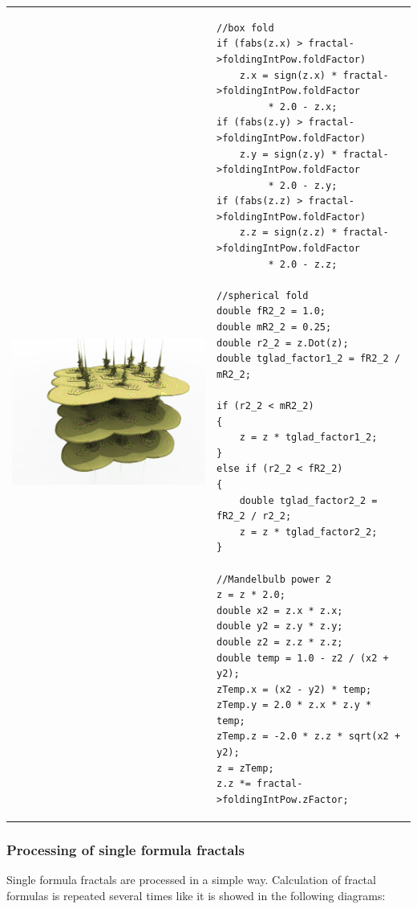 \begin{tabular}{l l}
	\includegraphics[width=0.3\linewidth]{img/manual/media/formula_box_fold_pwr2.png}	
	& 
	\begin{minipage}[b]{0.5\linewidth}
	    \begin{lstlisting}
//box fold
if (fabs(z.x) > fractal->foldingIntPow.foldFactor)
	z.x = sign(z.x) * fractal->foldingIntPow.foldFactor
		 * 2.0 - z.x;
if (fabs(z.y) > fractal->foldingIntPow.foldFactor)
	z.y = sign(z.y) * fractal->foldingIntPow.foldFactor
		 * 2.0 - z.y;
if (fabs(z.z) > fractal->foldingIntPow.foldFactor)
	z.z = sign(z.z) * fractal->foldingIntPow.foldFactor
		 * 2.0 - z.z;

//spherical fold
double fR2_2 = 1.0;
double mR2_2 = 0.25;
double r2_2 = z.Dot(z);
double tglad_factor1_2 = fR2_2 / mR2_2;

if (r2_2 < mR2_2)
{
	z = z * tglad_factor1_2;
}
else if (r2_2 < fR2_2)
{
	double tglad_factor2_2 = fR2_2 / r2_2;
	z = z * tglad_factor2_2;
}

//Mandelbulb power 2
z = z * 2.0;
double x2 = z.x * z.x;
double y2 = z.y * z.y;
double z2 = z.z * z.z;
double temp = 1.0 - z2 / (x2 + y2);
zTemp.x = (x2 - y2) * temp;
zTemp.y = 2.0 * z.x * z.y * temp;
zTemp.z = -2.0 * z.z * sqrt(x2 + y2);
z = zTemp;
z.z *= fractal->foldingIntPow.zFactor;
        \end{lstlisting}
	\end{minipage}
\end{tabular} 

\subsubsection{Processing of single formula fractals}

Single formula fractals are processed in a simple way. Calculation of fractal
formulas is repeated several times like it is showed in the following
diagrams:\nolinebreak \nopagebreak


